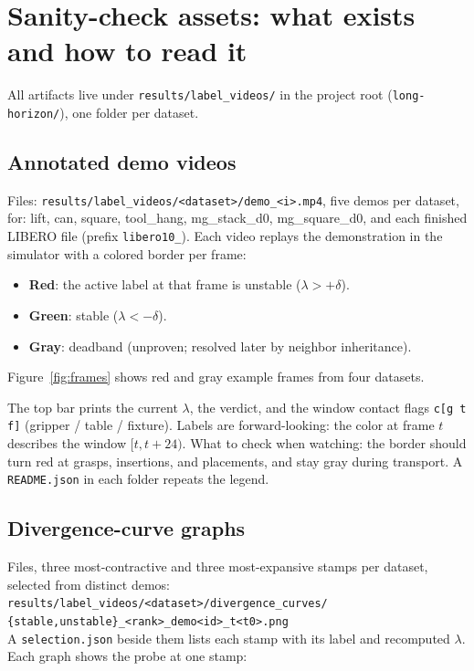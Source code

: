 \documentclass[11pt]{article}
\begin{document}
\section{Sanity-check assets: what exists and how to read it}

All artifacts live under \texttt{results/label\_videos/} in the project root
(\texttt{long-horizon/}), one folder per dataset.

\subsection{Annotated demo videos}

Files: \texttt{results/label\_videos/<dataset>/demo\_<i>.mp4}, five demos per
dataset, for: lift, can, square, tool\_hang, mg\_stack\_d0, mg\_square\_d0, and each
finished LIBERO file (prefix \texttt{libero10\_}). Each video replays the
demonstration in the simulator with a colored border per frame:

\begin{itemize}[leftmargin=2em]
  \item \textbf{Red}: the active label at that frame is unstable
        ($\lambda > +\delta$).
  \item \textbf{Green}: stable ($\lambda < -\delta$).
  \item \textbf{Gray}: deadband (unproven; resolved later by neighbor inheritance).
\end{itemize}

Figure~\ref{fig:frames} shows red and gray example frames from four datasets.

The top bar prints the current $\lambda$, the verdict, and the window contact flags
\texttt{c[g t f]} (gripper / table / fixture). Labels are forward-looking: the color
at frame $t$ describes the window $[t, t{+}24)$. What to check when watching: the
border should turn red at grasps, insertions, and placements, and stay gray during
transport. A \texttt{README.json} in each folder repeats the legend.

\subsection{Divergence-curve graphs}

Files, three most-contractive and three most-expansive stamps per dataset, selected
from distinct demos:\\
\texttt{results/label\_videos/<dataset>/divergence\_curves/}\\
\texttt{\{stable,unstable\}\_<rank>\_demo<id>\_t<t0>.png}\\
A \texttt{selection.json} beside them lists each stamp with its label and recomputed
$\lambda$. Each graph shows the probe at one stamp:
\end{document}
